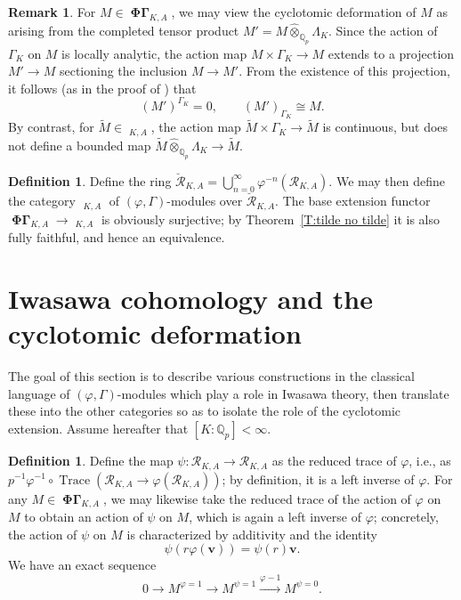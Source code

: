 \documentclass[12pt]{amsart}
\theoremstyle{definition}
\newtheorem{defn}[theorem]{Definition}
\newtheorem{remark}[theorem]{Remark}
\numberwithin{equation}{theorem}
\newcommand{\bv}{\mathbf{v}}
\newcommand{\Qp}{\mathbb{Q}_p}
\newcommand{\QQ}{\mathbb{Q}}
\newcommand{\calR}{\mathcal{R}}
\DeclareMathOperator{\PhiGamma}{\mathbf{\Phi \Gamma}}
\DeclareMathOperator{\PhiGammabreve}{\breve{\mathbf{\Phi \Gamma}}}
\DeclareMathOperator{\PhiGammatilde}{\widetilde{\mathbf{\Phi \Gamma}}}
\DeclareMathOperator{\Trace}{Trace}
\begin{document}
\begin{remark} \label{R:Gamma acyclic}
For $M \in \PhiGamma_{K,A}$, we may view the cyclotomic deformation of $M$ as arising from the completed tensor product $M' = M \widehat{\otimes}_{\Qp} \Lambda_K$. Since the action of $\Gamma_K$ on $M$ is locally analytic, the action map $M \times \Gamma_K \to M$ extends to a projection $M' \to M$ sectioning the inclusion $M \to M'$. From the existence of this projection, it follows (as in the proof of \cite[Theorem~4.4.8]{kpx}) that 
\[
(M')^{\Gamma_K} = 0, \qquad (M')_{\Gamma_K} \cong M.
\]
By contrast, for $\tilde{M} \in \PhiGammatilde_{K,A}$, the action map
$\tilde{M} \times \Gamma_K \to \tilde{M}$ is continuous, but does not define a bounded map
$\tilde{M} \widehat{\otimes}_{\QQ_p} \Lambda_K \to \tilde{M}$.
\end{remark}

\begin{defn}
Define the ring $\breve{\calR}_{K,A} = \bigcup_{n=0}^\infty \varphi^{-n}(\calR_{K,A})$.
We may then define the category $\PhiGammabreve_{K,A}$ of $(\varphi, \Gamma)$-modules over $\breve{\calR}_{K,A}$. The base extension functor $\PhiGamma_{K,A} \to \PhiGammabreve_{K,A}$ is obviously surjective; by Theorem~\ref{T:tilde no tilde} it is also fully faithful, and hence an equivalence.
\end{defn}

\section{Iwasawa cohomology and the cyclotomic deformation}

The goal of this section is to describe various constructions in the classical language of $(\varphi, \Gamma)$-modules which play a role in Iwasawa theory, then translate these into the other categories so as to isolate the role of the cyclotomic extension.
Assume hereafter that $[K:\QQ_p] < \infty$.

\begin{defn}
Define the map $\psi: \calR_{K,A} \to \calR_{K,A}$ as the reduced trace of $\varphi$, i.e.,
as $p^{-1} \varphi^{-1} \circ \Trace(\calR_{K,A} \to \varphi(\calR_{K,A}))$;
by definition, it is a left inverse of $\varphi$. For any $M \in \PhiGamma_{K,A}$,
we may likewise take the reduced trace of the action of $\varphi$ on $M$ to obtain an action of $\psi$ on $M$, which is again a left inverse of $\varphi$;
concretely, the action of $\psi$ on $M$ is characterized by additivity and the identity
\[
\psi(r \varphi(\bv)) = \psi(r) \bv.
\]
We have an exact sequence
\begin{equation} \label{eq:psi sequence}
0 \to M^{\varphi=1} \to M^{\psi=1} \stackrel{\varphi-1}{\longrightarrow} M^{\psi=0}.
\end{equation}
\end{defn}
\end{document}
